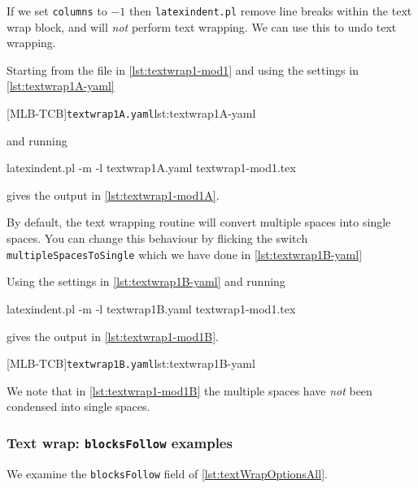 \documentclass[10pt]{article}
\begin{document}
 \begin{example}
 If we set \texttt{columns} to $-1$ then \texttt{latexindent.pl} remove line breaks
 within the text wrap block, and will \emph{not} perform text wrapping. We can use this
 to undo text wrapping. 

 Starting from the file in \cref{lst:textwrap1-mod1} and using the settings in
 \cref{lst:textwrap1A-yaml}

 [MLB-TCB]{\texttt{textwrap1A.yaml}}{lst:textwrap1A-yaml}

 and running

 \begin{commandshell}
latexindent.pl -m -l textwrap1A.yaml textwrap1-mod1.tex
\end{commandshell}

 gives the output in \cref{lst:textwrap1-mod1A}.

 \end{example}

 \begin{example}
 By default, the text wrapping routine will convert multiple spaces into single spaces.
 You can change this behaviour by flicking the switch \texttt{multipleSpacesToSingle}
 which we have done in \cref{lst:textwrap1B-yaml}

 Using the settings in \cref{lst:textwrap1B-yaml} and running

 \begin{commandshell}
latexindent.pl -m -l textwrap1B.yaml textwrap1-mod1.tex
\end{commandshell}

 gives the output in \cref{lst:textwrap1-mod1B}.
 \begin{cmhtcbraster}[raster column skip=.1\linewidth]
  [MLB-TCB]{\texttt{textwrap1B.yaml}}{lst:textwrap1B-yaml}
 \end{cmhtcbraster}
 We note that in \cref{lst:textwrap1-mod1B} the multiple spaces have \emph{not} been
 condensed into single spaces.
 \end{example}

\subsubsection{Text wrap: \texttt{blocksFollow} examples}
 We examine the \texttt{blocksFollow} field of \cref{lst:textWrapOptionsAll}. 
\end{document}
